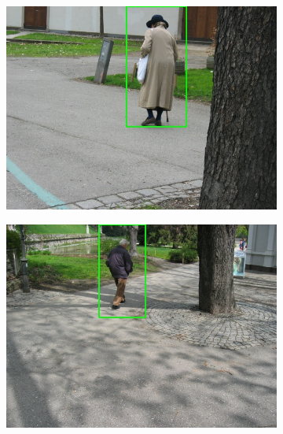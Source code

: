 \documentclass[galician]{./head/uvigo-tfg}
\begin{document}
\begin{figure}[h]
\begin{subfigure}{.5\textwidth}
          \includegraphics[width=0.8\linewidth]{figures/person2.jpg}
          \label{fig:person2}
        \end{subfigure}
        \begin{subfigure}{.5\textwidth}
          \centering
          \includegraphics[width=0.8\linewidth]{figures/person3.jpg}
          \label{fig:person3}
        \end{subfigure}
        \begin{subfigure}{.3\textwidth}
          \centering

\end{subfigure}
\end{figure}
\end{document}
